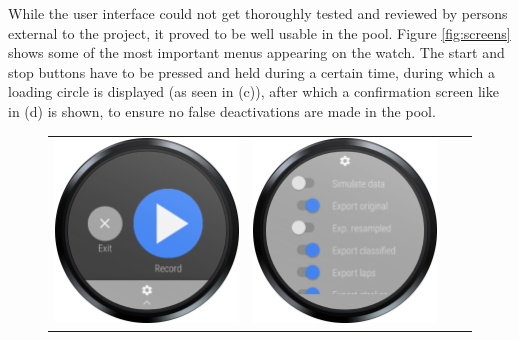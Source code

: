\documentclass[a4paper, oneside]{discothesis}
\begin{document}
While the user interface could not get thoroughly tested and reviewed by persons external to the project, it proved to be well usable in the pool. Figure \ref{fig:screens} shows some of the most important menus appearing on the watch. The start and stop buttons have to be pressed and held during a certain time, during which a loading circle is displayed (as seen in (c)), after which a confirmation screen like in (d) is shown, to ensure no false deactivations are made in the pool.
\begin{figure} [H]
\centering
\begin{tabular}{cccc}
\includegraphics[scale=1.1]{figures/app/startmenu.png} &
\includegraphics[scale=1.1]{figures/app/optionsmenu.png} \\

\end{tabular}
\end{figure}
\end{document}
